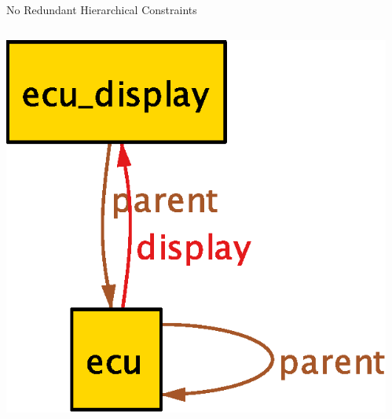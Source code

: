 \documentclass[table,15pt,t]{beamer}
\newcounter{i}
\begin{document}
\begin{frame}{No Redundant Hierarchical Constraints} %
  \begin{columns}
    \begin{column}{0.5\textwidth}
      \includegraphics[scale=0.5]{figs/parent-old}
    \end{column}
    \begin{column}{0.5\textwidth}

\end{column}
\end{columns}
\end{frame}
\end{document}
